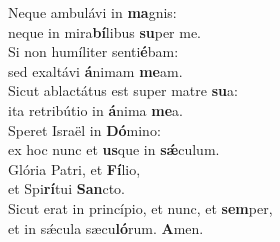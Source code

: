 \evenverse Neque ambulávi in \textbf{ma}gnis:~\*\\
\evenverse neque in mira\textbf{bí}libus \textbf{su}per me.\\
\oddverse Si non humíliter senti\textbf{é}bam:~\*\\
\oddverse sed exaltávi \textbf{á}nimam \textbf{me}am.\\
\evenverse Sicut ablactátus est super matre \textbf{su}a:~\*\\
\evenverse ita retribútio in \textbf{á}nima \textbf{me}a.\\
\oddverse Speret Israël in \textbf{Dó}mino:~\*\\
\oddverse ex hoc nunc et \textbf{us}que in \textbf{sǽ}culum.\\
\evenverse Glória Patri, et \textbf{Fí}lio,~\*\\
\evenverse et Spi\textbf{rí}tui \textbf{San}cto.\\
\oddverse Sicut erat in princípio, et nunc, et \textbf{sem}per,~\*\\
\oddverse et in sǽcula sæcu\textbf{ló}rum. \textbf{A}men.\\

